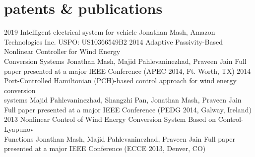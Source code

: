 \section{patents \& publications}

\begin{entrylist}
\entry
{2019}
{Intelligent electrical system for vehicle}
{{\headingfont Jonathan Mash}, Amazon Technologies Inc.}
{USPO: US10366549B2}
\entry
{2014}
{Adaptive Passivity-Based Nonlinear Controller for Wind Energy \\Conversion Systems}
{{\headingfont Jonathan Mash}, Majid Pahlevaninezhad, Praveen Jain}
{Full paper presented at a major IEEE Conference (APEC 2014, Ft. Worth, TX)}
\entry
{2014}
{Port-Controlled Hamiltonian (PCH)-based control approach for wind energy conversion \\systems}
{Majid Pahlevaninezhad, Shangzhi Pan, {\headingfont Jonathan Mash}, Praveen Jain}
{Full paper presented at a major IEEE Conference (PEDG 2014, Galway, Ireland)}
\entry
{2013}
{Nonlinear Control of Wind Energy Conversion System Based on Control-Lyapunov \\Functions}
{{\headingfont Jonathan Mash}, Majid Pahlevaninezhad, Praveen Jain}
{Full paper presented at a major IEEE Conference (ECCE 2013, Denver, CO)}
\end{entrylist}